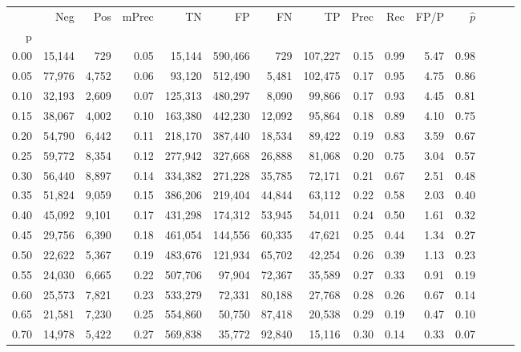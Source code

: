 \begin{tabular}{rrrrrrrrrrrrrrr}
\toprule
{} &     Neg &    Pos & mPrec &       TN &       FP &       FN &       TP &  Prec &   Rec &  FP/P & $\hat{p}$ \\
p    &         &        &       &          &          &          &          &       &       &       &           \\
\midrule
0.00 &  15,144 &    729 &  0.05 &   15,144 &  590,466 &      729 &  107,227 &  0.15 &  0.99 &  5.47 &      0.98 \\
0.05 &  77,976 &  4,752 &  0.06 &   93,120 &  512,490 &    5,481 &  102,475 &  0.17 &  0.95 &  4.75 &      0.86 \\
0.10 &  32,193 &  2,609 &  0.07 &  125,313 &  480,297 &    8,090 &   99,866 &  0.17 &  0.93 &  4.45 &      0.81 \\
0.15 &  38,067 &  4,002 &  0.10 &  163,380 &  442,230 &   12,092 &   95,864 &  0.18 &  0.89 &  4.10 &      0.75 \\
0.20 &  54,790 &  6,442 &  0.11 &  218,170 &  387,440 &   18,534 &   89,422 &  0.19 &  0.83 &  3.59 &      0.67 \\
0.25 &  59,772 &  8,354 &  0.12 &  277,942 &  327,668 &   26,888 &   81,068 &  0.20 &  0.75 &  3.04 &      0.57 \\
0.30 &  56,440 &  8,897 &  0.14 &  334,382 &  271,228 &   35,785 &   72,171 &  0.21 &  0.67 &  2.51 &      0.48 \\
0.35 &  51,824 &  9,059 &  0.15 &  386,206 &  219,404 &   44,844 &   63,112 &  0.22 &  0.58 &  2.03 &      0.40 \\
0.40 &  45,092 &  9,101 &  0.17 &  431,298 &  174,312 &   53,945 &   54,011 &  0.24 &  0.50 &  1.61 &      0.32 \\
0.45 &  29,756 &  6,390 &  0.18 &  461,054 &  144,556 &   60,335 &   47,621 &  0.25 &  0.44 &  1.34 &      0.27 \\
0.50 &  22,622 &  5,367 &  0.19 &  483,676 &  121,934 &   65,702 &   42,254 &  0.26 &  0.39 &  1.13 &      0.23 \\
0.55 &  24,030 &  6,665 &  0.22 &  507,706 &   97,904 &   72,367 &   35,589 &  0.27 &  0.33 &  0.91 &      0.19 \\
0.60 &  25,573 &  7,821 &  0.23 &  533,279 &   72,331 &   80,188 &   27,768 &  0.28 &  0.26 &  0.67 &      0.14 \\
0.65 &  21,581 &  7,230 &  0.25 &  554,860 &   50,750 &   87,418 &   20,538 &  0.29 &  0.19 &  0.47 &      0.10 \\
0.70 &  14,978 &  5,422 &  0.27 &  569,838 &   35,772 &   92,840 &   15,116 &  0.30 &  0.14 &  0.33 &      0.07 \\

\end{tabular}
